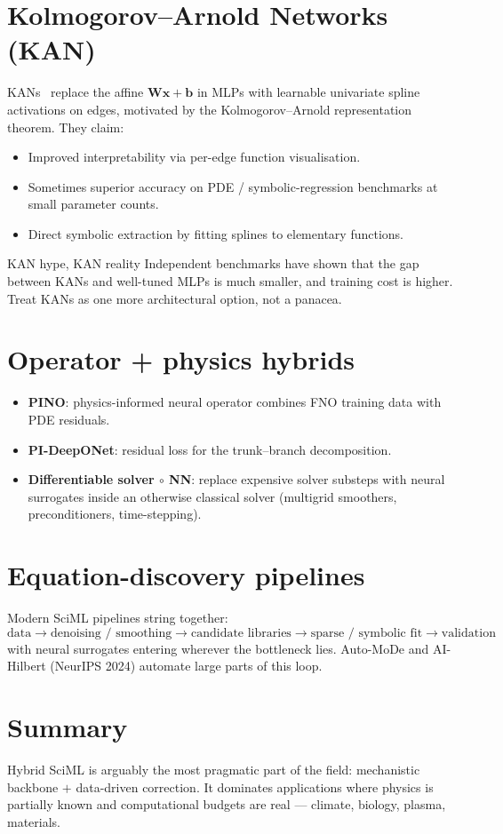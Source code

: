 \section{Kolmogorov--Arnold Networks (KAN)}
KANs~\cite{liu2024kan} replace the affine $\bm{W}\bm{x}+\bm{b}$ in MLPs
with learnable univariate spline activations on edges, motivated by the
Kolmogorov--Arnold representation theorem. They claim:
\begin{itemize}
\item Improved interpretability via per-edge function visualisation.
\item Sometimes superior accuracy on PDE / symbolic-regression
benchmarks at small parameter counts.
\item Direct symbolic extraction by fitting splines to elementary
functions.
\end{itemize}
\begin{pitfall}{KAN hype, KAN reality}
Independent benchmarks have shown that the gap between KANs and well-tuned MLPs is much smaller, and training cost is higher. Treat KANs
as one more architectural option, not a panacea.
\end{pitfall}

\section{Operator + physics hybrids}
\begin{itemize}
\item \textbf{PINO}: physics-informed neural operator combines FNO
training data with PDE residuals.
\item \textbf{PI-DeepONet}: residual loss for the trunk--branch
decomposition.
\item \textbf{Differentiable solver $\circ$ NN}: replace expensive
solver substeps with neural surrogates inside an otherwise classical
solver (multigrid smoothers, preconditioners, time-stepping).
\end{itemize}

\section{Equation-discovery pipelines}
Modern SciML pipelines string together:
\[
\text{data} \to \text{denoising / smoothing} \to \text{candidate libraries}
\to \text{sparse / symbolic fit} \to \text{validation}
\]
with neural surrogates entering wherever the bottleneck lies.
Auto-MoDe and AI-Hilbert (NeurIPS 2024) automate large parts of this
loop.

\section{Summary}
Hybrid SciML is arguably the most pragmatic part of the field:
mechanistic backbone $+$ data-driven correction. It dominates
applications where physics is partially known and computational budgets
are real --- climate, biology, plasma, materials.
